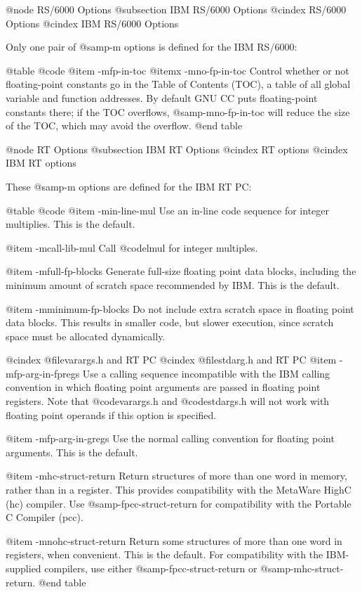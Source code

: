 {{@node RS/6000 Options
@subsection IBM RS/6000 Options
@cindex RS/6000 Options
@cindex IBM RS/6000 Options

Only one pair of @samp{-m} options is defined for the IBM RS/6000:

@table @code
@item -mfp-in-toc
@itemx -mno-fp-in-toc
Control whether or not floating-point constants go in the Table of
Contents (TOC), a table of all global variable and function addresses.  By
default GNU CC puts floating-point constants there; if the TOC overflows,
@samp{-mno-fp-in-toc} will reduce the size of the TOC, which may avoid
the overflow.
@end table

@node RT Options
@subsection IBM RT Options
@cindex RT options
@cindex IBM RT options

These @samp{-m} options are defined for the IBM RT PC:

@table @code
@item -min-line-mul
Use an in-line code sequence for integer multiplies.  This is the
default.

@item -mcall-lib-mul
Call @code{lmul$$} for integer multiples.

@item -mfull-fp-blocks
Generate full-size floating point data blocks, including the minimum
amount of scratch space recommended by IBM.  This is the default.

@item -mminimum-fp-blocks
Do not include extra scratch space in floating point data blocks.  This
results in smaller code, but slower execution, since scratch space must
be allocated dynamically.

@cindex @file{varargs.h} and RT PC
@cindex @file{stdarg.h} and RT PC
@item -mfp-arg-in-fpregs
Use a calling sequence incompatible with the IBM calling convention in
which floating point arguments are passed in floating point registers.
Note that @code{varargs.h} and @code{stdargs.h} will not work with
floating point operands if this option is specified.

@item -mfp-arg-in-gregs
Use the normal calling convention for floating point arguments.  This is
the default.

@item -mhc-struct-return
Return structures of more than one word in memory, rather than in a
register.  This provides compatibility with the MetaWare HighC (hc)
compiler.  Use @samp{-fpcc-struct-return} for compatibility with the
Portable C Compiler (pcc).

@item -mnohc-struct-return
Return some structures of more than one word in registers, when
convenient.  This is the default.  For compatibility with the
IBM-supplied compilers, use either @samp{-fpcc-struct-return} or
@samp{-mhc-struct-return}.
@end table

}}
